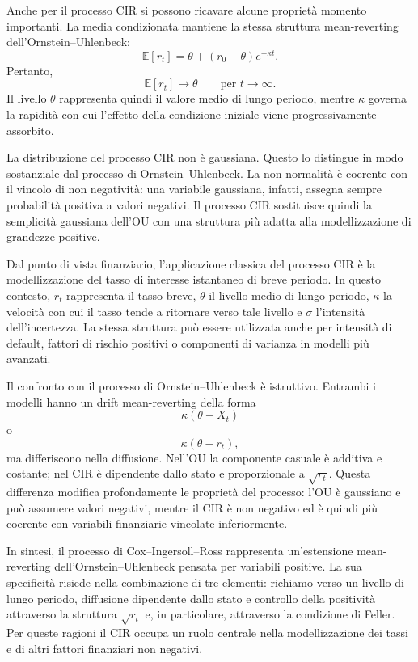 Anche per il processo CIR si possono ricavare alcune propriet\`{a}
momento importanti. La media condizionata mantiene la stessa struttura
mean-reverting dell'Ornstein--Uhlenbeck:
\[
\mathbb{E}[r_t]
=
\theta+(r_0-\theta)e^{-\kappa t}.
\]
Pertanto,
\[
\mathbb{E}[r_t]\longrightarrow\theta
\qquad
\text{per } t\to\infty.
\]
Il livello $\theta$ rappresenta quindi il valore medio di lungo periodo,
mentre $\kappa$ governa la rapidit\`{a} con cui l'effetto della condizione
iniziale viene progressivamente assorbito.

La distribuzione del processo CIR non \`{e} gaussiana. Questo lo distingue
in modo sostanziale dal processo di Ornstein--Uhlenbeck. La non
normalit\`{a} \`{e} coerente con il vincolo di non negativit\`{a}: una
variabile gaussiana, infatti, assegna sempre probabilit\`{a} positiva a
valori negativi. Il processo CIR sostituisce quindi la semplicit\`{a}
gaussiana dell'OU con una struttura pi\`{u} adatta alla modellizzazione di
grandezze positive.

Dal punto di vista finanziario, l'applicazione classica del processo CIR
\`{e} la modellizzazione del tasso di interesse istantaneo di breve
periodo. In questo contesto, $r_t$ rappresenta il tasso breve, $\theta$
il livello medio di lungo periodo, $\kappa$ la velocit\`{a} con cui il
tasso tende a ritornare verso tale livello e $\sigma$ l'intensit\`{a}
dell'incertezza. La stessa struttura pu\`{o} essere utilizzata anche per
intensit\`{a} di default, fattori di rischio positivi o componenti di
varianza in modelli pi\`{u} avanzati.

Il confronto con il processo di Ornstein--Uhlenbeck \`{e} istruttivo.
Entrambi i modelli hanno un drift mean-reverting della forma
\[
\kappa(\theta-X_t)
\]
o
\[
\kappa(\theta-r_t),
\]
ma differiscono nella diffusione. Nell'OU la componente casuale \`{e}
additiva e costante; nel CIR \`{e} dipendente dallo stato e proporzionale
a $\sqrt{r_t}$. Questa differenza modifica profondamente le propriet\`{a}
del processo: l'OU \`{e} gaussiano e pu\`{o} assumere valori negativi,
mentre il CIR \`{e} non negativo ed \`{e} quindi pi\`{u} coerente con
variabili finanziarie vincolate inferiormente.

In sintesi, il processo di Cox--Ingersoll--Ross rappresenta un'estensione
mean-reverting dell'Ornstein--Uhlenbeck pensata per variabili positive.
La sua specificit\`{a} risiede nella combinazione di tre elementi:
richiamo verso un livello di lungo periodo, diffusione dipendente dallo
stato e controllo della positivit\`{a} attraverso la struttura
$\sqrt{r_t}$ e, in particolare, attraverso la condizione di Feller. Per
queste ragioni il CIR occupa un ruolo centrale nella modellizzazione dei
tassi e di altri fattori finanziari non negativi.

